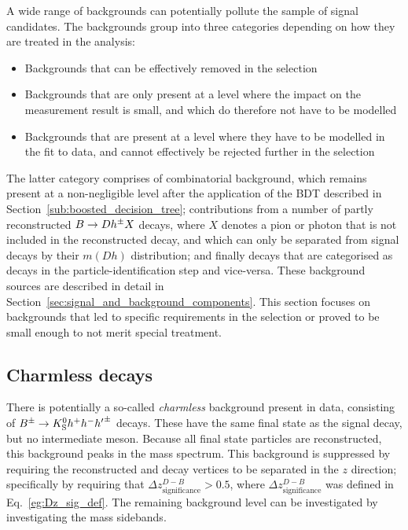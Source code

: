 A wide range of backgrounds can potentially pollute the sample of signal candidates. The backgrounds group into three categories depending on how they are treated in the analysis: 
\begin{itemize}
    \item Backgrounds that can be effectively removed in the selection
    \item Backgrounds that are only present at a level where the impact on the measurement result is small, and which do therefore not have to be modelled
    \item Backgrounds that are present at a level where they have to be modelled in the fit to data, and cannot effectively be rejected further in the selection
\end{itemize}
The latter category comprises of combinatorial background, which remains present at a non-negligible level after the application of the BDT described in Section~\ref{sub:boosted_decision_tree};  contributions from a number of partly reconstructed ${B}\rightarrow{\ensuremath{D}} h^\pm X$ decays, where $X$ denotes a pion or photon that is not included in the reconstructed decay, and which can only be separated from signal decays by their $m(Dh)$ distribution; and finally \BtoDpi decays that are categorised as \BtoDK decays in the particle-identification step and vice-versa. These background sources are described in detail in Section~\ref{sec:signal_and_background_components}. This section focuses on backgrounds that led to specific requirements in the selection or proved to be small enough to not merit special treatment.

\subsection{Charmless decays} %
\label{sub:charmless_decays}




There is potentially a so-called \emph{charmless} background present in data, consisting of ${{B}^\pm}\rightarrow{\ensuremath{{K}^0_{\mathrm{S}}}} h^+ h^- {h'}^\pm$ decays. These have the same final state as the signal decay, but no intermediate \D meson. Because all final state particles are reconstructed, this background peaks in the \B mass spectrum.
This background is suppressed by requiring the reconstructed \B and \D decay vertices to be separated in the $z$ direction; specifically by requiring that $\Delta z^{D-B}_{\text{significance}} > 0.5$, where $\Delta z^{D-B}_{\text{significance}}$ was defined in Eq.~\eqref{eg:Dz_sig_def}. The remaining background level can be investigated by investigating the \D mass sidebands. 

